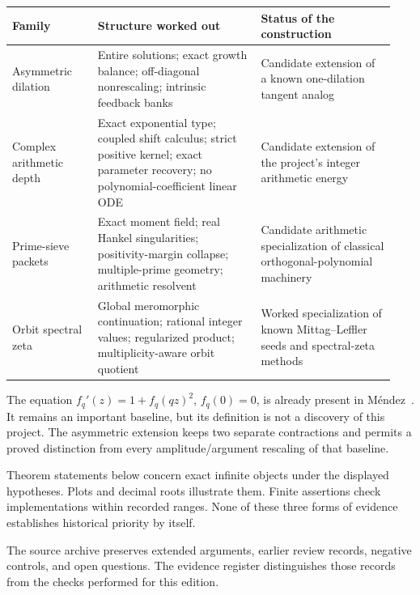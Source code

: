 \documentclass[11pt,oneside,openany]{book}
\begin{document}
\renewcommand{\arraystretch}{1.45}
\begin{tabular}{@{}>{\raggedright\arraybackslash}P{0.21\linewidth}>{\raggedright\arraybackslash}P{0.40\linewidth}>{\raggedright\arraybackslash}P{0.33\linewidth}@{}}
\toprule
Family & Structure worked out & Status of the construction\\
\midrule
Asymmetric dilation & Entire solutions; exact growth balance;
off-diagonal nonrescaling; intrinsic feedback banks & Candidate extension of a
known one-dilation tangent analog\\
Complex arithmetic depth & Exact exponential type; coupled shift calculus;
strict positive kernel; exact parameter recovery; no polynomial-coefficient linear ODE & Candidate
extension of the project's integer arithmetic energy\\
Prime-sieve packets & Exact moment field; real Hankel singularities;
positivity-margin collapse; multiple-prime geometry; arithmetic resolvent & Candidate arithmetic
specialization of classical orthogonal-polynomial machinery\\
Orbit spectral zeta & Global meromorphic continuation; rational integer values;
regularized product; multiplicity-aware orbit quotient & Worked specialization of known
Mittag--Leffler seeds and spectral-zeta methods\\
\bottomrule
\end{tabular}

The equation $f_q'(z)=1+f_q(qz)^2$, $f_q(0)=0$, is already present in
M\'endez~\cite[Example~2.4]{Mendez2024}. It remains an
important baseline, but its definition is not a discovery of this project.
The asymmetric extension keeps two separate contractions and permits a
proved distinction from every amplitude/argument rescaling of that baseline.

Theorem statements below concern exact infinite objects under the displayed
hypotheses. Plots and decimal roots illustrate them. Finite assertions check
implementations within recorded ranges. None of these three forms of evidence
establishes historical priority by itself.

The source archive preserves extended arguments, earlier review records, negative controls, and open questions. The evidence register distinguishes those records from the checks performed for this edition.


\mainmatter
{}
\end{document}
